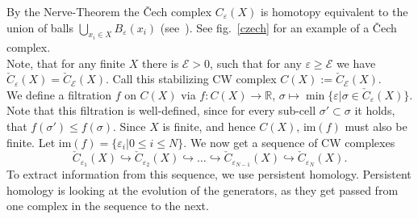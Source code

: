 \documentclass[11pt, a4paper, UKenglish]{article}
\newcommand{\bR}{\mathbb{R}}
\newcommand{\im}{\textrm{im}}
\begin{document}
	By the Nerve-Theorem the Čech complex $C_\varepsilon(X)$ is homotopy equivalent to the union of balls $\bigcup_{x_i\in X} B_\varepsilon(x_i)$ (see\ \cite{eat}).
	See fig.~\ref{czech} for an example of a Čech complex.\\
    Note, that for any finite $X$ there is $\mathcal{E}>0$, such that for any $\varepsilon\geq\mathcal{E}$ we have $\check C_\varepsilon(X) = \check C_\mathcal{E}(X)$.
    Call this stabilizing CW complex $C(X):=\check C_\mathcal{E}(X)$.\\
    We define a filtration $f$ on $C(X)$ via $f:C(X)\rightarrow\bR$, $\sigma\mapsto\min\{\varepsilon|\sigma\in \check C_\varepsilon(X)\}$.
    Note that this filtration is well-defined, since for every sub-cell $\sigma'\subset\sigma$ it holds, that $f(\sigma')\leq f(\sigma)$.
    Since $X$ is finite, and hence $C(X)$, $\im(f)$ must also be finite.
    Let $\im(f)=\{\varepsilon_i|0\leq i\leq N\}$.
    We now get a sequence of CW complexes \[\check C_{\varepsilon_1}(X)\hookrightarrow \check C_{\varepsilon_2}(X)\hookrightarrow \ldots \hookrightarrow \check C_{\varepsilon_{N-1}}(X)\hookrightarrow \check C_{\varepsilon_N}(X).\]
    To extract information from this sequence, we use persistent homology. Persistent homology is looking at the evolution of the generators, as they get passed from one complex in the sequence to the next.
\end{document}
